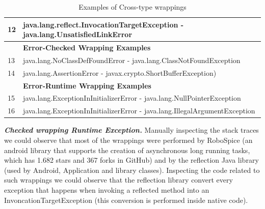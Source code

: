 \documentclass[conference]{IEEEtran}
\begin{document}
\begin{table}
\begin{tabular}{ll}
12&java.lang.reflect.InvocationTargetException - java.lang.UnsatisfiedLinkError	 \\ %
\hline
& \bfseries{Error-Checked Wrapping Examples}  \\
 \hline
13&java.lang.NoClassDefFoundError - java.lang.ClassNotFoundException   \\ %
14&java.lang.AssertionError - javax.crypto.ShortBufferException)   \\ %
\hline
& \bfseries{Error-Runtime Wrapping Examples}    \\
 \hline
15&java.lang.ExceptionInInitializerError - java.lang.NullPointerException   \\ %
16&java.lang.ExceptionInInitializerError - java.lang.IllegalArgumentException 	 \\ %
 \hline
  \end{tabular}
\caption{Examples of Cross-type wrappings}
\label{tab:exampeswrap}
\end{table}


\emph{\textbf{Checked wrapping Runtime Exception.}} Manually inspecting the stack 
traces we could observe that most of the wrappings were performed 
by RoboSpice (an android library that supports the creation of asynchronous long running 
tasks, which has 1.682 stars and 367 forks in GitHub) and by the reflection Java library (used by Android, 
Application and library classes). Inspecting the code related to such wrappings we could observe that
the reflection library convert every exception that happens 
when invoking a reflected method into an InvoncationTargetException (this conversion is 
performed inside native code).

\end{document}

